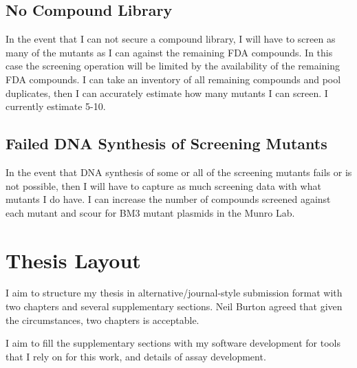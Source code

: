\documentclass{article}
\begin{document}
\subsection{No Compound Library}
In the event that I can not secure a compound library, I will have to screen as many of the mutants as I can against the remaining FDA compounds. In this case the screening operation will be limited by the availability of the remaining FDA compounds. I can take an inventory of all remaining compounds and pool duplicates, then I can accurately estimate how many mutants I can screen. I currently estimate 5-10. 

\subsection{Failed DNA Synthesis of Screening Mutants}
In the event that DNA synthesis of some or all of the screening mutants fails or is not possible, then I will have to capture as much screening data with what mutants I do have. I can increase the number of compounds screened against each mutant and scour for BM3 mutant plasmids in the Munro Lab. 
\par

\section{Thesis Layout} \label{thesis layout}
I aim to structure my thesis in alternative/journal-style submission format with two chapters and several supplementary sections. Neil Burton agreed that given the circumstances, two chapters is acceptable. %
\par 
I aim to fill the supplementary sections with my software development for tools that I rely on for this work, and details of assay development.

\par
\par
\end{document}
